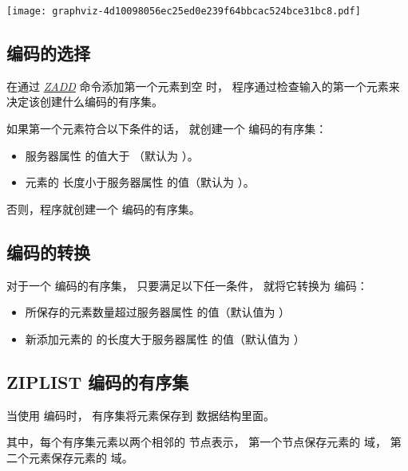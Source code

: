 \documentclass[a4paper,11pt,english]{sphinxmanual}
\begin{document}
\texttt{[image: graphviz-4d10098056ec25ed0e239f64bbcac524bce31bc8.pdf]}


\subsection{编码的选择}
\label{datatype/sorted_set:id2}
在通过 \href{http://redis.readthedocs.org/en/latest/sorted\_set/zadd.html\#zadd}{\emph{ZADD}} 命令添加第一个元素到空  时，
程序通过检查输入的第一个元素来决定该创建什么编码的有序集。

如果第一个元素符合以下条件的话，
就创建一个  编码的有序集：
\begin{itemize}
\item {} 
服务器属性  的值大于  （默认为  ）。

\item {} 
元素的  长度小于服务器属性  的值（默认为  ）。

\end{itemize}

否则，程序就创建一个  编码的有序集。


\subsection{编码的转换}
\label{datatype/sorted_set:id3}
对于一个  编码的有序集，
只要满足以下任一条件，
就将它转换为  编码：
\begin{itemize}
\item {} 
 所保存的元素数量超过服务器属性  的值（默认值为  ）

\item {} 
新添加元素的  的长度大于服务器属性  的值（默认值为  ）

\end{itemize}


\subsection{ZIPLIST 编码的有序集}
\label{datatype/sorted_set:ziplist}
当使用  编码时，
有序集将元素保存到  数据结构里面。

其中，每个有序集元素以两个相邻的  节点表示，
第一个节点保存元素的  域，
第二个元素保存元素的  域。
\end{document}
